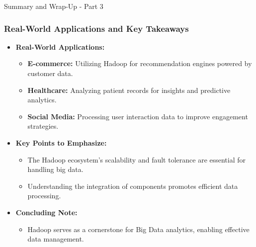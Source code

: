 \documentclass[aspectratio=169]{beamer}
\begin{document}
\begin{frame}[fragile]{Summary and Wrap-Up - Part 3}
    \frametitle{Real-World Applications and Key Takeaways}
    
    \begin{itemize}
        \item \textbf{Real-World Applications:}
            \begin{itemize}
                \item \textbf{E-commerce:} Utilizing Hadoop for recommendation engines powered by customer data.
                \item \textbf{Healthcare:} Analyzing patient records for insights and predictive analytics.
                \item \textbf{Social Media:} Processing user interaction data to improve engagement strategies.
            \end{itemize}
        
        \item \textbf{Key Points to Emphasize:}
            \begin{itemize}
                \item The Hadoop ecosystem's scalability and fault tolerance are essential for handling big data.
                \item Understanding the integration of components promotes efficient data processing.
            \end{itemize}
        
        \item \textbf{Concluding Note:}
            \begin{itemize}
                \item Hadoop serves as a cornerstone for Big Data analytics, enabling effective data management.
            \end{itemize}
    \end{itemize}
\end{frame}
\end{document}
